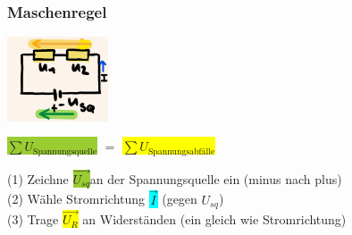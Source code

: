     \subsubsection*{Maschenregel}
    \vspace{-1mm}
    \begin{minipage}{0.49\linewidth}
        \begin{footnotesize}
            \begin{center}
                \vspace{2mm}
                \includegraphics[width = 30mm]{src/images/maschenregel.png}
            \end{center}
        \end{footnotesize}
    \end{minipage}
    \begin{minipage}{0.5\linewidth}
        \begin{scriptsize}
            \begin{center}
            \end{center}
        \end{scriptsize}
    \end{minipage}
    \vspace{1mm}
    \hfill \colorbox{YellowGreen}{$\sum U_\text{Spannungsquelle}$} $=$ \colorbox{Yellow}{$\sum U_\text{Spannungsabfälle}$} 

    (1) Zeichne \colorbox{YellowGreen}{$\overrightarrow{U_{sq}}$}an der Spannungsquelle ein (minus nach plus)
    \\(2) Wähle Stromrichtung \colorbox{Cyan}{$\overrightarrow{I}$} (gegen $U_{sq}$)
    \\(3) Trage \colorbox{Yellow}{$\overrightarrow{U_R}$} an Widerständen (ein gleich wie Stromrichtung)